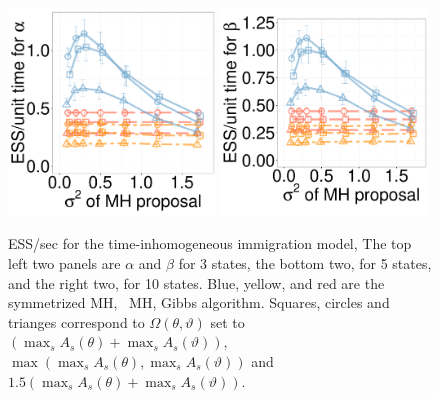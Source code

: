 \begin{figure}[H]
  \begin{minipage}[h!]{0.49\linewidth}
  \centering
    \includegraphics [width=0.49\textwidth, angle=0]{figs/new_whole_exp_figs/cq_alpha_dim5.pdf}
    \includegraphics [width=0.49\textwidth, angle=0]{figs/new_whole_exp_figs/cq_beta_dim5.pdf}
  \end{minipage}
  \begin{minipage}[!hp]{0.49\linewidth}
    \caption{ESS/sec for the time-inhomogeneous immigration model, The top left two panels are $\alpha$ and $\beta$ for 3 states, the bottom two, for 5 states, and the right two, for 10 states. Blue, yellow, and red are the symmetrized MH, \naive\ MH, Gibbs algorithm. Squares, circles and trianges correspond to $\Omega(\theta,\vartheta)$ set to $(\max_s A_s(\theta) + \max_s A_s(\vartheta))$, $\max(\max_s A_s(\theta), \max_s A_s(\vartheta))$ and  $1.5(\max_s A_s(\theta) + \max_s A_s(\vartheta))$.}
     \label{fig:ESS_CQ}
  \end{minipage}
  \end{figure}




